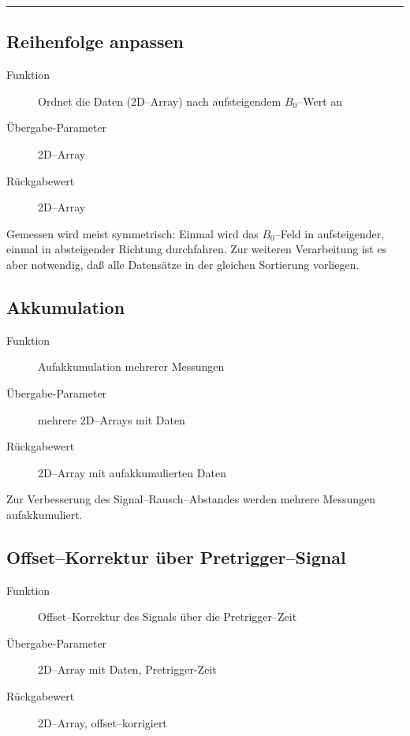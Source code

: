 \documentclass{article}
\begin{document}
\vspace{-1ex}
\hrule
\vspace{1em}


\subsection{Reihenfolge anpassen}

\begin{description}
  \item[Funktion] Ordnet die Daten (2D--Array) nach aufsteigendem $B_0$--Wert an
  \item[Übergabe-Parameter] 2D--Array
  \item[Rückgabewert] 2D--Array
\end{description}

Gemessen wird meist symmetrisch: Einmal wird das $B_0$--Feld in aufsteigender,
einmal in absteigender Richtung durchfahren. Zur weiteren Verarbeitung ist es
aber notwendig, daß alle Datensätze in der gleichen Sortierung vorliegen.


\subsection{Akkumulation}

\begin{description}
  \item[Funktion] Aufakkumulation mehrerer Messungen
  \item[Übergabe-Parameter] mehrere 2D--Arrays mit Daten
  \item[Rückgabewert] 2D--Array mit aufakkumulierten Daten
\end{description}

Zur Verbesserung des Signal--Rausch--Abstandes werden mehrere Messungen aufakkumuliert.


\subsection{Offset--Korrektur über Pretrigger--Signal}

\begin{description}
  \item[Funktion] Offset--Korrektur des Signals über die Pretrigger--Zeit
  \item[Übergabe-Parameter] 2D--Array mit Daten, Pretrigger-Zeit
  \item[Rückgabewert] 2D--Array, offset--korrigiert
\end{description}
\end{document}
